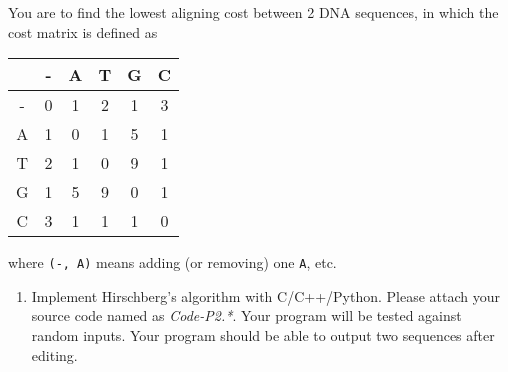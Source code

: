 \documentclass[12pt,a4paper]{article}
\theoremstyle{definition}
\begin{document}
\begin{enumerate}
    You are to find the lowest aligning cost between 2 DNA sequences, in which the cost matrix is defined as

    \begin{center}
        \begin{tabular}{|c||c|c|c|c|c|}
        \hline
          & - & A & T & G & C \\
        \hline
        - & 0 & 1 & 2 & 1 & 3 \\
        A & 1 & 0 & 1 & 5 & 1 \\
        T & 2 & 1 & 0 & 9 & 1 \\
        G & 1 & 5 & 9 & 0 & 1 \\
        C & 3 & 1 & 1 & 1 & 0 \\
        \hline
        \end{tabular}
    \end{center}

    where \texttt{(-, A)} means adding (or removing) one \texttt{A}, etc.

    \begin{enumerate}
        \item
        Implement Hirschberg's algorithm with C/C++/Python. Please attach your source code named as {\color{red}\emph{Code-P2.*}}. Your program will be tested against random inputs. Your program should be able to output two sequences after editing.


\end{enumerate}
\end{enumerate}
\end{document}
